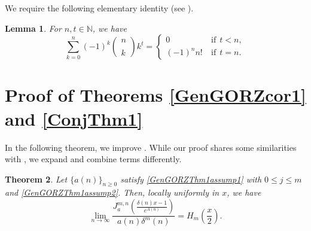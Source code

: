 \documentclass[11pt,reqno,a4paper]{amsart}
\renewcommand{\d}{{\delta}}
\renewcommand{\(}{\left\(}
\renewcommand{\)}{\right\)}
\numberwithin{equation}{section}
\theoremstyle{plain}
\newtheorem{theorem}{Theorem}[section]
\newtheorem{lemma}[theorem]{Lemma}
\theoremstyle{definition} %
\numberwithin{equation}{section}
\renewcommand{\binom}[2]{\left(\begin{smallmatrix}#1\\\\#2\end{smallmatrix}\right)}
\begin{document}
We require the following elementary identity (see \cite[26.8.4 and 26.8.6]{DLMF}).
\begin{lemma}\label{useful}
For $n,t\in\mathbb{N}$, we have %
\begin{equation*}%
\sum_{k=0}^{n}(-1)^k\binom{n}{k}k^t=\begin{cases}
0&\ \text{if}\ \ t<n,\\
(-1)^n n!&\ \text{if}\ \ t=n.
\end{cases}
\end{equation*}
\end{lemma}







\section{Proof of Theorems \ref{GenGORZcor1} and \ref{ConjThm1}}\label{sec:GenJensen}


 In the following theorem, we improve . While our proof shares some similarities with \cite{GORZ}, we expand and combine terms differently. 

\begin{theorem}\label{GenGORZThm1}
	Let $\{a(n)\}_{n\ge 0}$ satisfy {\rm{\ref{GenGORZThm1assump1}}} with $0\le j\le m$ and {\rm{\ref{GenGORZThm1assump2}}}. Then, locally uniformly in $x$, we have
\[
\lim_{n\to \infty}\frac{J^{m,n}_{a}\left(\frac{\d(n)x-1}{e^{A(n)}}\right)}{a(n)\d^{m}(n)}=H_m\left(\frac x2\right).
\]%
\end{theorem}
\end{document}
